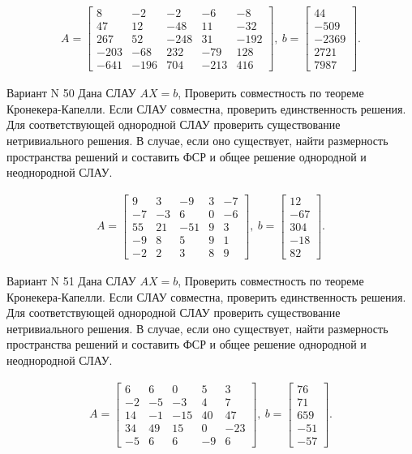 \documentclass[11pt]{report}
\begin{document}
\begin{align*}
 A = \left[\begin{matrix}8 & -2 & -2 & -6 & -8\\47 & 12 & -48 & 11 & -32\\267 & 52 & -248 & 31 & -192\\-203 & -68 & 232 & -79 & 128\\-641 & -196 & 704 & -213 & 416\end{matrix}\right],
\ b = \left[\begin{matrix}44\\-509\\-2369\\2721\\7987\end{matrix}\right]. 
 \end{align*}

Вариант N 50
Дана СЛАУ $AX = b$,
Проверить совместность по теореме Кронекера-Капелли. Если СЛАУ совместна, проверить единственность решения.
Для соответствующей однородной СЛАУ проверить существование нетривиального решения. В случае, если оно существует,
найти размерность пространства решений и составить ФСР и общее решение однородной  и неоднородной СЛАУ.


\begin{align*}
 A = \left[\begin{matrix}9 & 3 & -9 & 3 & -7\\-7 & -3 & 6 & 0 & -6\\55 & 21 & -51 & 9 & 3\\-9 & 8 & 5 & 9 & 1\\-2 & 2 & 3 & 8 & 9\end{matrix}\right],
\ b = \left[\begin{matrix}12\\-67\\304\\-18\\82\end{matrix}\right]. 
 \end{align*}

Вариант N 51
Дана СЛАУ $AX = b$,
Проверить совместность по теореме Кронекера-Капелли. Если СЛАУ совместна, проверить единственность решения.
Для соответствующей однородной СЛАУ проверить существование нетривиального решения. В случае, если оно существует,
найти размерность пространства решений и составить ФСР и общее решение однородной  и неоднородной СЛАУ.


\begin{align*}
 A = \left[\begin{matrix}6 & 6 & 0 & 5 & 3\\-2 & -5 & -3 & 4 & 7\\14 & -1 & -15 & 40 & 47\\34 & 49 & 15 & 0 & -23\\-5 & 6 & 6 & -9 & 6\end{matrix}\right],
\ b = \left[\begin{matrix}76\\71\\659\\-51\\-57\end{matrix}\right]. 
 \end{align*}
\end{document}
